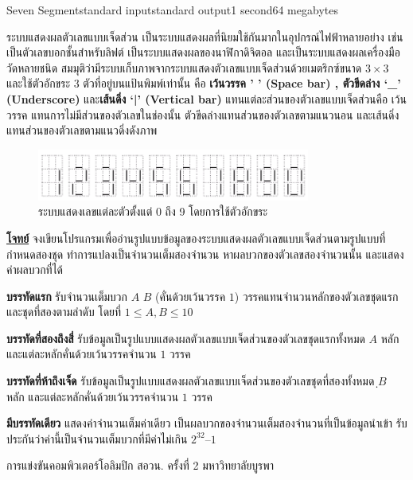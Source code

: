 \documentclass[11pt,a4paper]{article}
\begin{document}
\begin{problem}{Seven Segment}{standard input}{standard output}{1 second}{64 megabytes}

ระบบแสดงผลตัวเลขแบบเจ็ดส่วน เป็นระบบแสดงผลที่นิยมใช้กันมากในอุปกรณ์ไฟฟ้าหลายอย่าง เช่นเป็นตัวเลขบอกชั้นสำหรับลิฟต์ เป็นระบบแสดงผลของนาฬิกาดิจิตอล และเป็นระบบแสดงผลเครื่องมือวัดหลายชนิด สมมุติว่ามีระบบเก็บภาพจากระบบแสดงตัวเลขแบบเจ็ดส่วนด้วยเมตริกซ์ขนาด $3 \times  3$ และใช้ตัวอักขระ $3$ ตัวที่อยู่บนแป้นพิมพ์เท่านั้น คือ \textbf{เว้นวรรค ' ' (Space bar) , ตัวขีดล่าง ‘\_’ (Underscore) }และ\textbf{เส้นดิ่ง ‘|’ (Vertical bar)} แทนแต่ละส่วนของตัวเลขแบบเจ็ดส่วนคือ เว้นวรรค แทนการไม่มีส่วนของตัวเลขในช่องนั้น ตัวขีดล่างแทนส่วนของตัวเลขตามแนวนอน และเส้นดิ่งแทนส่วนของตัวเลขตามแนวดิ่งดังภาพ


\begin{figure}[h]
\centering
\includegraphics[width=0.8\textwidth]{../latex/img/1009/1009-1.png}
\caption{ระบบแสดงเลขแต่ละตัวตั้งแต่ 0 ถึง 9 โดยการใช้ตัวอักขระ}
\end{figure}

\underline{\textbf{โจทย์}} จงเขียนโปรแกรมเพื่ออ่านรูปแบบข้อมูลของระบบแสดงผลตัวเลขแบบเจ็ดส่วนตามรูปแบบที่กำหนดสองชุด ทำการแปลงเป็นจำนวนเต็มสองจำนวน หาผลบวกของตัวเลขสองจำนวนนั้น และแสดงค่าผลบวกที่ได้

\InputFile

\textbf{บรรทัดแรก} รับจำนวนเต็มบวก $A$ $B$ (คั่นด้วยเว้นวรรค $1$) วรรคแทนจำนวนหลักของตัวเลขชุดแรกและชุดที่สองตามลำดับ โดยที่ $1 \leq A,B \leq 10$ 

\textbf{บรรทัดที่สองถึงสี่} รับข้อมูลเป็นรูปแบบแสดงผลตัวเลขแบบเจ็ดส่วนของตัวเลขชุดแรกทั้งหมด $A$ หลัก และแต่ละหลักคั่นด้วยเว้นวรรคจำนวน $1$ วรรค 

\textbf{บรรทัดที่ห้าถึงเจ็ด} รับข้อมูลเป็นรูปแบบแสดงผลตัวเลขแบบเจ็ดส่วนของตัวเลขชุดที่สองทั้งหมด $ฺB$ หลัก และแต่ละหลักคั่นด้วยเว้นวรรคจำนวน $1$ วรรค 

\OutputFile

\textbf{มีบรรทัดเดียว} แสดงค่าจำนวนเต็มค่าเดียว เป็นผลบวกของจำนวนเต็มสองจำนวนที่เป็นข้อมูลนำเข้า รับประกันว่าค่านี้เป็นจำนวนเต็มบวกที่มีค่าไม่เกิน $2^{32} – 1$

\Examples

\begin{example}
%
%
\end{example}

\Source

การแข่งขันคอมพิวเตอร์โอลิมปิก สอวน. ครั้งที่ 2 มหาวิทยาลัยบูรพา

\end{problem}
\end{document}
